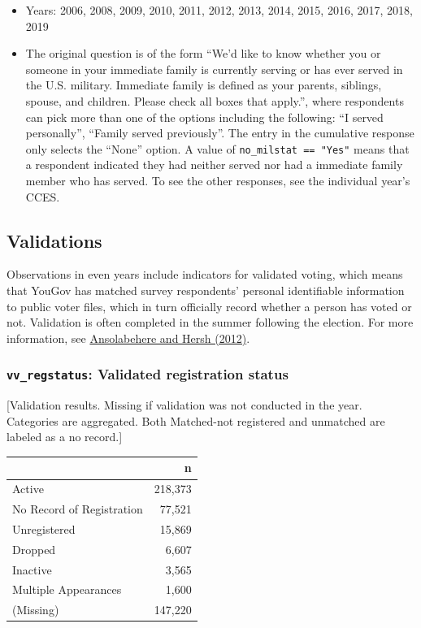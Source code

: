 \documentclass[10pt,article,oneside]{memoir}
\theoremstyle{definition}
\begin{document}
\begin{itemize}
\tightlist
\item
  Years: 2006, 2008, 2009, 2010, 2011, 2012, 2013, 2014, 2015, 2016,
  2017, 2018, 2019
\item
  The original question is of the form ``We'd like to know whether you
  or someone in your immediate family is currently serving or has ever
  served in the U.S. military. Immediate family is defined as your
  parents, siblings, spouse, and children. Please check all boxes that
  apply.'', where respondents can pick more than one of the options
  including the following: ``I served personally'', ``Family served
  previously''. The entry in the cumulative response only selects the
  ``None'' option. A value of \texttt{no\_milstat\ ==\ "Yes"} means that
  a respondent indicated they had neither served nor had a immediate
  family member who has served. To see the other responses, see the
  individual year's CCES.
\end{itemize}

\newpage

\hypertarget{validations}{%
\subsection{Validations}\label{validations}}

Observations in even years include indicators for validated voting,
which means that YouGov has matched survey respondents' personal
identifiable information to public voter files, which in turn officially
record whether a person has voted or not. Validation is often completed
in the summer following the election. For more information, see
\href{https://doi.org/10.1093/pan/mps023}{Ansolabehere and Hersh
(2012)}.

\hypertarget{vv_regstatus-validated-registration-status}{%
\subsubsection{\texorpdfstring{\texttt{vv\_regstatus}: Validated
registration
status}{vv\_regstatus: Validated registration status}}\label{vv_regstatus-validated-registration-status}}

{[}Validation results. Missing if validation was not conducted in the
year. Categories are aggregated. Both Matched-not registered and
unmatched are labeled as a no record.{]}

\begin{table}[H]
\centering
\begin{tabular}{lr}
\toprule
 & n\\
\midrule
Active & 218,373\\
No Record of Registration & 77,521\\
Unregistered & 15,869\\
Dropped & 6,607\\
Inactive & 3,565\\
Multiple Appearances & 1,600\\
(Missing) & 147,220\\
\bottomrule
\end{tabular}
\end{table}
\end{document}
